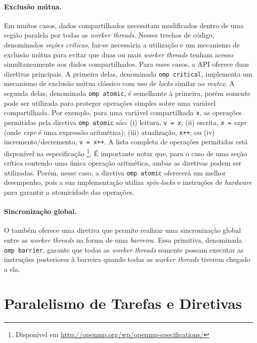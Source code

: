 \documentclass{SBCbookchapter}
\begin{document}
		\paragraph{Exclusão mútua.} Em muitos casos, dados compartilhados necessitam modificados dentro
		de uma região paralela por todas as \textit{worker threads}. Nesses trechos de código, denominados
		\textit{seções críticas}, faz-se necessária a utilização e um mecanismo de exclusão mútua para evitar
		que duas ou mais \textit{worker threads} tenham acesso simultaneamente aos dados compartilhados.
		Para esses casos, a API \openmp oferece duas diretivas principais. A primeira delas, denominada
		\texttt{omp critical}, implementa um mecanismo de exclusão mútua clássico com uso de \textit{locks}
		similar ao \textit{mutex}. A segunda delas, denominada \texttt{omp atomic}, é semelhante à primeira, 
		porém somente pode ser utilizada para proteger operações simples sobre uma variável compartilhada.
		Por exemplo, para uma variável compartilhada \texttt{x}, as operações permitidas pela diretiva
		\texttt{omp atomic} são: (i) leitura, \eg \texttt{v = x}; (ii) escrita, \eg \texttt{x =} \textit{expr}
		(onde \textit{expr} é uma expressão aritmética); (iii) atualização, \eg \texttt{x++}; ou (iv) 
		incremento/decremento, \eg \texttt{v = x++}. A lista completa de operações permitidas está
		disponível na especificação \openmp\footnote{Disponível em \url{http://openmp.org/wp/openmp-specifications/}}.
		É importante notar que, para o caso de uma seção crítica contendo uma única operação aritmética,
		ambas as diretivas podem ser utilizadas. Porém, nesse caso, a diretiva \texttt{omp atomic} oferecerá
		um melhor desempenho, pois a sua implementação utiliza \textit{spin-locks} e instruções de \textit{hardware}
		para garantir a atomicidade das operações.
		
		\paragraph{Sincronização global.} O \openmp também oferece uma diretiva que permite realizar uma
		sincronização global entre as \textit{worker threads} na forma de uma \textit{barreira}. Essa primitiva,
		denominada \texttt{omp barrier}, garante que todas as \textit{worker threads} somente possam executar
		as instruções posteriores à barreira quando todas as \textit{worker threads} tiverem chegado a ela.
	
\section{Paralelismo de Tarefas e Diretivas \openmp}
\label{sec:paralelismo tarefas}
\end{document}
